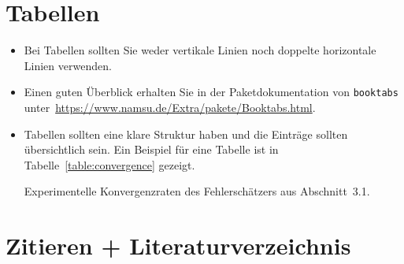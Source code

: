 \section{Tabellen}
\begin{itemize}
  \item Bei Tabellen sollten Sie weder vertikale Linien noch doppelte horizontale Linien verwenden.
  \item Einen guten Überblick erhalten Sie in der Paketdokumentation von \verb$booktabs$ unter~\url{https://www.namsu.de/Extra/pakete/Booktabs.html}.
  \item Tabellen sollten eine klare Struktur haben und die Einträge sollten übersichtlich sein. Ein Beispiel für eine Tabelle ist in Tabelle~\ref{table:convergence} gezeigt.
  
  \begin{table}
    \centering
    
    \caption{Experimentelle Konvergenzraten des Fehlerschätzers aus Abschnitt~3.1.}
    \label{table:convergence}
  \end{table}
\end{itemize}

\section{Zitieren + Literaturverzeichnis}

